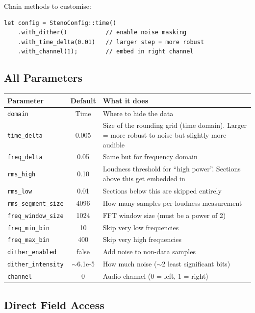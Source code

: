 \documentclass[11pt,a4paper]{article}
\begin{document}
Chain methods to customise:

\begin{lstlisting}[style=rust]
let config = StenoConfig::time()
    .with_dither()           // enable noise masking
    .with_time_delta(0.01)   // larger step = more robust
    .with_channel(1);        // embed in right channel
\end{lstlisting}

\subsection{All Parameters}

\begin{center}
\begin{tabular}{@{}lcp{7.5cm}@{}}
\toprule
Parameter & Default & What it does \\
\midrule
\texttt{domain} & Time & Where to hide the data \\
\texttt{time\_delta} & 0.005 & Size of the rounding grid (time domain).
    Larger = more robust to noise but slightly more audible \\
\texttt{freq\_delta} & 0.05 & Same but for frequency domain \\
\texttt{rms\_high} & 0.10 & Loudness threshold for ``high power''.
    Sections above this get embedded in \\
\texttt{rms\_low} & 0.01 & Sections below this are skipped entirely \\
\texttt{rms\_segment\_size} & 4096 & How many samples per loudness measurement \\
\texttt{freq\_window\_size} & 1024 & FFT window size (must be a power of 2) \\
\texttt{freq\_min\_bin} & 10 & Skip very low frequencies \\
\texttt{freq\_max\_bin} & 400 & Skip very high frequencies \\
\texttt{dither\_enabled} & false & Add noise to non-data samples \\
\texttt{dither\_intensity} & $\sim$6.1e-5 & How much noise ($\sim$2 least significant bits) \\
\texttt{channel} & 0 & Audio channel (0 = left, 1 = right) \\
\bottomrule
\end{tabular}
\end{center}

\subsection{Direct Field Access}
\end{document}
